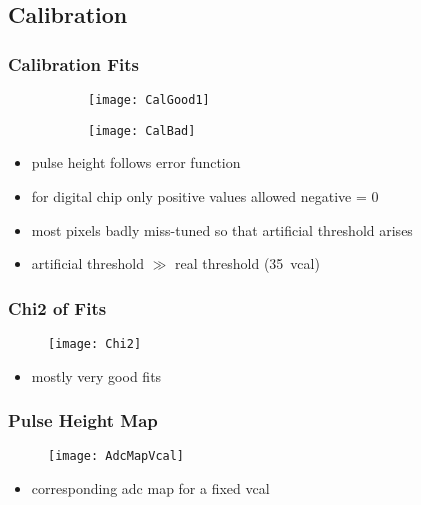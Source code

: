 \subsection{Calibration}
\begin{frame}
	\frametitle{Calibration Fits}
	\begin{figure} 
		\begin{center}
			\begin{subfigure}{0.45\textwidth}  
				\centering 
				\texttt{[image: CalGood1]}
			\end{subfigure}
			\begin{subfigure}{0.45\textwidth} 
				\centering 
				\texttt{[image: CalBad]}
			\end{subfigure} 
		\end{center}
	\end{figure}
	\begin{itemize}
		\item pulse height follows error function
		\item for digital chip only positive values allowed \ra negative = 0 
		\item most pixels badly miss-tuned so that artificial threshold arises
		\item artificial threshold $\gg$ real threshold (\SI{35}{vcal})
	\end{itemize}
\end{frame}
\begin{frame}
	\frametitle{Chi2 of Fits}
	\begin{figure} 
		\centering 
		\texttt{[image: Chi2]}
	\end{figure}
	\begin{itemize}
		\item mostly very good fits
	\end{itemize}
\end{frame}
\begin{frame}
	\frametitle{Pulse Height Map}
	\begin{figure} 
		\centering 
		\texttt{[image: AdcMapVcal]}
	\end{figure}
	\begin{itemize}
		\item corresponding adc map for a fixed vcal
	\end{itemize}
\end{frame}
